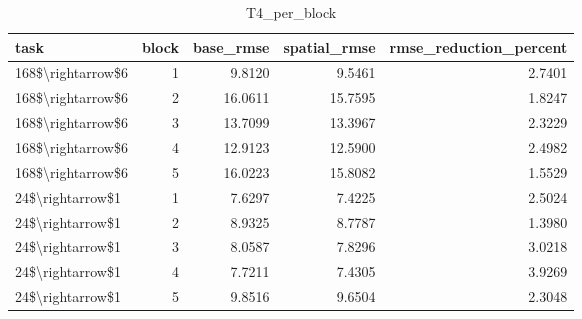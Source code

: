\begin{table}
\caption{T4_per_block}
\label{tab:T4_per_block}
\begin{tabular}{lrrrr}
\toprule
task & block & base\_rmse & spatial\_rmse & rmse\_reduction\_percent \\
\midrule
168\$\textbackslash rightarrow\$6 & 1 & 9.8120 & 9.5461 & 2.7401 \\
168\$\textbackslash rightarrow\$6 & 2 & 16.0611 & 15.7595 & 1.8247 \\
168\$\textbackslash rightarrow\$6 & 3 & 13.7099 & 13.3967 & 2.3229 \\
168\$\textbackslash rightarrow\$6 & 4 & 12.9123 & 12.5900 & 2.4982 \\
168\$\textbackslash rightarrow\$6 & 5 & 16.0223 & 15.8082 & 1.5529 \\
24\$\textbackslash rightarrow\$1 & 1 & 7.6297 & 7.4225 & 2.5024 \\
24\$\textbackslash rightarrow\$1 & 2 & 8.9325 & 8.7787 & 1.3980 \\
24\$\textbackslash rightarrow\$1 & 3 & 8.0587 & 7.8296 & 3.0218 \\
24\$\textbackslash rightarrow\$1 & 4 & 7.7211 & 7.4305 & 3.9269 \\
24\$\textbackslash rightarrow\$1 & 5 & 9.8516 & 9.6504 & 2.3048 \\
\bottomrule
\end{tabular}
\end{table}

